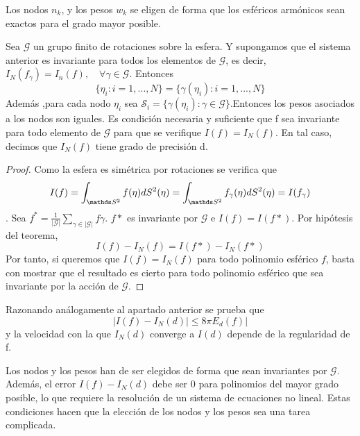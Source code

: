 Los nodos ${n_k}$, y los pesos ${w_k}$ se eligen de forma que los esféricos armónicos sean exactos para el grado mayor posible.

\begin{thm}Sea $\mathcal{G}$ un grupo finito de rotaciones sobre la esfera. Y supongamos que el sistema anterior es invariante para todos los elementos de $\mathcal{G}$, es decir, $I_N(f_\gamma)=I_n(f), \quad \forall \gamma \in \mathcal{G}$. Entonces $$\{\eta_i:i=1,...,N\}=\{\gamma(\eta_i):i=1,...,N\}$$ Además ,para cada nodo $\eta_i$ sea $\mathcal{S}_i=\{\gamma(\eta_i):\gamma \in \mathcal{G}\}$.Entonces los pesos asociados a los nodos son iguales. Es condición necesaria y suficiente que f sea invariante para todo elemento de $\mathcal{G}$ para que  se verifique $I(f)=I_N(f)$. En tal caso, decimos que $I_N(f)$ tiene grado de precisión d.

\end{thm}
\begin{proof}
Como la esfera es simétrica por rotaciones se verifica que $$I(f) = \int_{\esfera} f(\eta)dS^2(\eta) = \int_{\esfera} f_\gamma(\eta)dS^2(\eta) = I(f_\gamma)$$.
Sea $f^* = \frac{1}{|\mathcal{G}|} \sum_{\gamma \in |\mathcal{G}| } f\gamma$. $f*$ es invariante por $\mathcal{G}$ e $I(f) = I(f*)$. Por hipótesis del teorema, $$
I(f)-I_N(f) = I(f*) - I_N(f*) $$
Por tanto, si queremos que $I(f)=I_N(f)$ para todo polinomio esférico $f$, basta con mostrar que el resultado es cierto para todo polinomio esférico que sea invariante por la acción de  $\mathcal{G}$.
\end{proof}
Razonando análogamente al apartado anterior se prueba que
$$
|I(f)-I_N(d)| \le 8\pi E_d(f)|
$$
y la velocidad con la que $I_N(d)$ converge a $I(d)$ depende de la regularidad de f.
\medskip

Los nodos y los pesos han de ser elegidos de forma que sean invariantes por $\mathcal{G}$. Además, el error $I(f)-I_N(d)$ debe ser 0 para polinomios del mayor grado posible, lo que requiere la resolución de un sistema de ecuaciones no lineal. Estas condiciones hacen que la elección de los nodos y los pesos sea una tarea complicada.

